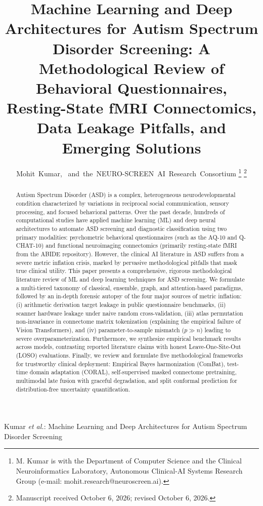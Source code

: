\documentclass[journal]{IEEEtran}
\begin{document}
\title{Machine Learning and Deep Architectures for Autism Spectrum Disorder Screening: A Methodological Review of Behavioral Questionnaires, Resting-State fMRI Connectomics, Data Leakage Pitfalls, and Emerging Solutions}

\author{Mohit~Kumar,~
        and~the~NEURO-SCREEN~AI~Research~Consortium%
\thanks{M. Kumar is with the Department of Computer Science and the Clinical Neuroinformatics Laboratory, Autonomous Clinical-AI Systems Research Group (e-mail: mohit.research@neuroscreen.ai).}%
\thanks{Manuscript received October 6, 2026; revised October 6, 2026.}}

%
{Kumar \MakeLowercase{\textit{et al.}}: Machine Learning and Deep Architectures for Autism Spectrum Disorder Screening}

\maketitle

\begin{abstract}
Autism Spectrum Disorder (ASD) is a complex, heterogeneous neurodevelopmental condition characterized by variations in reciprocal social communication, sensory processing, and focused behavioral patterns. Over the past decade, hundreds of computational studies have applied machine learning (ML) and deep neural architectures to automate ASD screening and diagnostic classification using two primary modalities: psychometric behavioral questionnaires (such as the AQ-10 and Q-CHAT-10) and functional neuroimaging connectomics (primarily resting-state fMRI from the ABIDE repository). However, the clinical AI literature in ASD suffers from a severe metric inflation crisis, marked by pervasive methodological pitfalls that mask true clinical utility. This paper presents a comprehensive, rigorous methodological literature review of ML and deep learning techniques for ASD screening. We formulate a multi-tiered taxonomy of classical, ensemble, graph, and attention-based paradigms, followed by an in-depth forensic autopsy of the four major sources of metric inflation: (i) arithmetic derivation target leakage in public questionnaire benchmarks, (ii) scanner hardware leakage under naive random cross-validation, (iii) atlas permutation non-invariance in connectome matrix tokenization (explaining the empirical failure of Vision Transformers), and (iv) parameter-to-sample mismatch ($p \gg n$) leading to severe overparameterization. Furthermore, we synthesize empirical benchmark results across models, contrasting reported literature claims with honest Leave-One-Site-Out (LOSO) evaluations. Finally, we review and formulate five methodological frameworks for trustworthy clinical deployment: Empirical Bayes harmonization (ComBat), test-time domain adaptation (CORAL), self-supervised masked connectome pretraining, multimodal late fusion with graceful degradation, and split conformal prediction for distribution-free uncertainty quantification.
\end{abstract}
\end{document}
